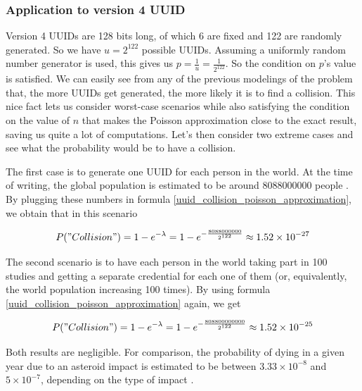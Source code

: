 \documentclass{report}
\begin{document}
\subsubsection{Application to version 4 UUID} \label{application_to_version_4_uuid}
Version 4 UUIDs are 128 bits long, of which 6 are fixed and 122 are randomly generated. So we have $u=2^{122}$ possible UUIDs. Assuming a uniformly random number generator is used, this gives us
$p=\frac{1}{u}=\frac{1}{2^{122}}$. So the condition on $p$'s value is satisfied. We can easily see from any of the previous modelings of the problem that, the more UUIDs get generated, the more likely it is to find a
collision. This nice fact lets us consider worst-case scenarios while also satisfying the condition on the value of $n$ that makes the Poisson approximation close to the exact result,
saving us quite a lot of computations. Let's then consider two extreme cases and see what the probability would be to have a collision. \par
The first case is to generate one UUID for each person in the world. At the time of writing, the global population is estimated to be around \num{8088000000} people
\cite{world-population}. By plugging these numbers in formula \ref{uuid_collision_poisson_approximation}, we obtain that in this scenario

	$$P("Collision")=1-e^{-\lambda}=1-e^{-\frac{8088000000}{2^{122}}} \approx 1.52 \times 10^{-27}$$

The second scenario is to have each person in the world taking part in 100 studies and getting a separate credential for each one of them (or, equivalently, the world population
increasing 100 times). By using formula
\ref{uuid_collision_poisson_approximation} again, we get

$$P("Collision")=1-e^{-\lambda}=1-e^{-\frac{808800000000}{2^{122}}} \approx 1.52 \times 10^{-25}$$ 

Both results are negligible. For comparison, the probability of dying in a given year due to an asteroid impact is estimated to be between $3.33 \times 10^{-8}$ and $5 \times
10^{-7}$, depending on the type of impact \cite{death-by-asteroid}.
\end{document}
